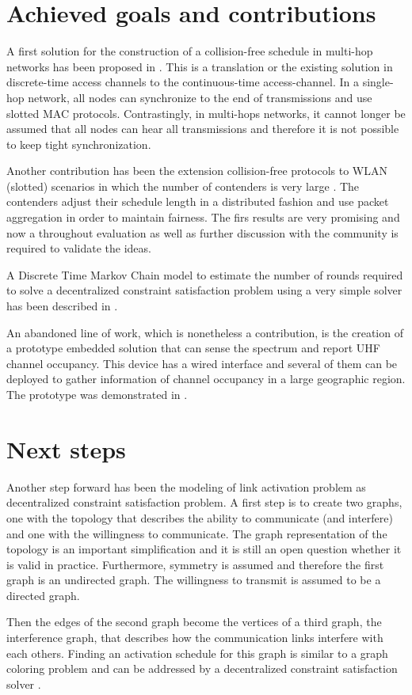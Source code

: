 \documentclass[a4paper,twocolumns]{article}%
\begin{document}
\section{Achieved goals and contributions}

A first solution for the construction of a collision-free schedule in multi-hop networks has been proposed in \cite{}.
This is a translation or the existing solution in discrete-time access channels to the continuous-time access-channel.
In a single-hop network, all nodes can synchronize to the end of transmissions and use slotted MAC protocols.
Contrastingly, in multi-hops networks, it cannot longer be assumed that all nodes can hear all transmissions and therefore it is not possible to keep tight synchronization.


Another contribution has been the extension collision-free protocols to WLAN (slotted) scenarios in which the number of contenders is very large \cite{}.
The contenders adjust their schedule length in a distributed fashion and use packet aggregation in order to maintain fairness.
The firs results are very promising \cite{} and now a throughout evaluation as well as further discussion with the community is required to validate the ideas.

A Discrete Time Markov Chain model to estimate the number of rounds required to solve a decentralized constraint satisfaction problem using a very simple solver has been described in \cite{}.

An abandoned line of work, which is nonetheless a contribution, is the creation of a prototype embedded solution that can sense the spectrum and report UHF channel occupancy.
This device has a wired interface and several of them can be deployed to gather information of channel occupancy in a large geographic region.
The prototype was demonstrated in \cite{}.


\section{Next steps}

Another step forward has been the modeling of link activation problem as decentralized constraint satisfaction problem.
A first step is to create two graphs, one with the topology that describes the ability to communicate (and interfere) and one with the willingness to communicate.
The graph representation of the topology is an important simplification and it is still an open question whether it is valid in practice.
Furthermore, symmetry is assumed and therefore the first graph is an undirected graph.
The willingness to transmit is assumed to be a directed graph.

Then the edges of the second graph become the vertices of a third graph, the interference graph, that describes how the communication links interfere with each others.
Finding an activation schedule for this graph is similar to a graph coloring problem and can be addressed by a decentralized constraint satisfaction solver \cite{}.






\end{document}
